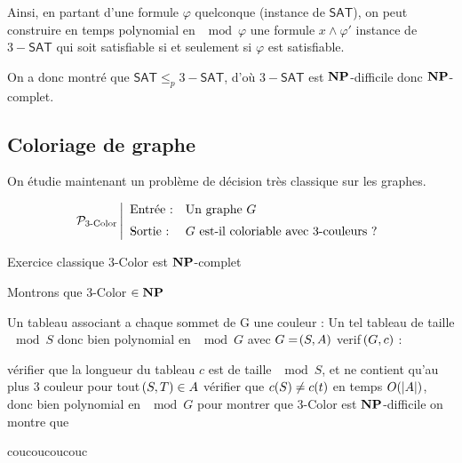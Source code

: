\documentclass[a4paper,french,bookmarks]{book}
\newcommand{\cNP}{\bbN\bbP}
\newcommand{\SAT}{\textsf{SAT}}
\begin{document}
    Ainsi, en partant d'une formule $\varphi$ quelconque (instance de $\SAT$), on peut construire en temps polynomial en $\mod{\varphi}$ une formule $x \land \varphi'$ instance de $3-\SAT$ qui soit satisfiable si et seulement si $\varphi$ est satisfiable.
    
    On a donc montré que $\SAT \leq_p 3-\SAT$, d'où $3-\SAT$ est $\cNP$-difficile donc $\cNP$-complet.
        
    \subsection{Coloriage de graphe}
            
        On étudie maintenant un problème de décision très classique sur les graphes.
            
        \[ \mathcal{P}_\text{3-Color} \left\vert\begin{array}{ll}
            \text{Entrée :} & \text{Un graphe $G$}  \\[0.2cm]
            \text{Sortie :} & \text{$G$ est-il coloriable avec 3-couleurs ?}
        \end{array}\right.\]
            
        \begin{theorem}{Exercice classique}{}
            3-Color est $\cNP$-complet
        \end{theorem}
        \begin{nproof}
            Montrons que 3-Color $\in \cNP$
            \begin{enumerate}
                \itt Un tableau associant a chaque sommet de G une couleur : Un tel tableau de taille $\mod S$ donc bien polynomial en $\mod G$ avec $G = \!\left(S, A\right)$
                \itt verif $\!\left(G, c\right)$ :
                \begin{enumerate}
                    \itt vérifier que la longueur du tableau $c$ est de taille $\mod S$, et ne contient qu'au plus 3 couleur
                    \itt pour tout $\!\left(S, T\right) \in A$ vérifier que $c\!\left(S\right) \neq c\!\left(t\right)$ en temps $O\!\left(\left\lvert A\right\rvert\right)$, donc bien polynomial en $\mod G$
                    \itt pour montrer que 3-Color est $\cNP$-difficile on montre que 
                \end{enumerate}
            \end{enumerate}
        \end{nproof}
        
        
        
        \begin{form}
            coucoucoucouc
        \end{form}
        
        
\end{document}
